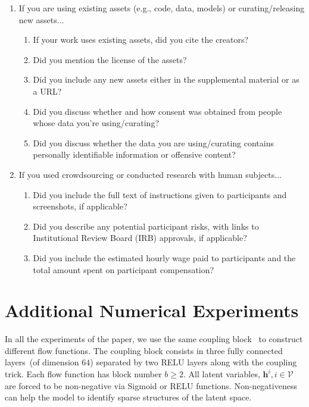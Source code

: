 \documentclass{article}
\begin{document}
\begin{enumerate}
\item If you are using existing assets (e.g., code, data, models) or curating/releasing new assets...
\begin{enumerate}
  \item If your work uses existing assets, did you cite the creators?
    \answerYes{}
  \item Did you mention the license of the assets?
    \answerNo{}
  \item Did you include any new assets either in the supplemental material or as a URL?
    \answerNo{}
  \item Did you discuss whether and how consent was obtained from people whose data you're using/curating?
    \answerYes{}
  \item Did you discuss whether the data you are using/curating contains personally identifiable information or offensive content?
    \answerNo{}
\end{enumerate}

\item If you used crowdsourcing or conducted research with human subjects...
\begin{enumerate}
  \item Did you include the full text of instructions given to participants and screenshots, if applicable?
    \answerNA{}
  \item Did you describe any potential participant risks, with links to Institutional Review Board (IRB) approvals, if applicable?
    \answerNA{}
  \item Did you include the estimated hourly wage paid to participants and the total amount spent on participant compensation?
    \answerNA{}
\end{enumerate}

\end{enumerate}


\appendix
\newpage

\section{Additional Numerical Experiments}
In all the experiments of the paper, we use the same  coupling block~\cite{Dinh2016DensityEU} to construct different flow functions. 
The coupling block consists in three fully connected layers~(of dimension $64$) separated by two RELU layers along with the coupling trick. 
Each flow function has block number $b\geqslant 2$. 
All latent variables, $\mathbf{h}^{i}, i \in \mathcal{V}$ are forced to be non-negative via Sigmoid or RELU functions. 
Non-negativeness can help the model to identify sparse structures of the latent space. 
\end{document}
